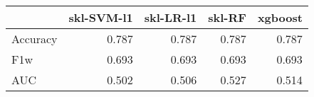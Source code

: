 \begin{tabular}{lrrrr}
\toprule
{} &  skl-SVM-l1 &  skl-LR-l1 &  skl-RF &  xgboost \\
\midrule
Accuracy &       0.787 &      0.787 &   0.787 &    0.787 \\
F1w      &       0.693 &      0.693 &   0.693 &    0.693 \\
AUC      &       0.502 &      0.506 &   0.527 &    0.514 \\
\bottomrule
\end{tabular}
